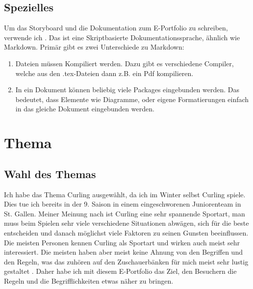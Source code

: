\documentclass[11pt]{article}
\begin{document}

    \subsection{Spezielles}
    Um das Storyboard und die Dokumentation zum E-Portfolio zu schreiben, verwende ich \latex. Das ist
    eine Skriptbasierte Dokumentationssprache, ähnlich wie Markdown. Primär gibt es zwei Unterschiede zu
    Markdown:
    \begin{enumerate}
        \item \latex Dateien müssen Kompiliert werden. Dazu gibt es verschiedene Compiler, welche aus den
        .tex-Dateien dann z.B. ein Pdf kompilieren.
        \item In ein \latex Dokument können beliebig viele Packages eingebunden werden. Das bedeutet, dass
        Elemente wie Diagramme, oder eigene Formatierungen einfach in das gleiche Dokument eingebunden werden.
    \end{enumerate}

    \pagebreak


    \section{Thema}



    \subsection{Wahl des Themas}

    Ich habe das Thema Curling ausgewählt, da ich im Winter selbst Curling spiele. Dies tue ich bereits in der
    9. Saison in einem eingeschworenen Juniorenteam in St. Gallen.
    Meiner Meinung nach ist Curling eine sehr spannende Sportart, man muss beim Spielen sehr viele verschiedene
    Situationen abwägen, sich für die beste entscheiden und danach möglichst viele Faktoren zu seinen Gunsten
    beeinflussen. \\
    Die meisten Personen kennen Curling als Sportart und wirken auch meist sehr interessiert. Die meisten haben
    aber meist keine Ahnung von den Begriffen und den Regeln, was das zuhören auf den Zuschauerbänken für mich
    meist sehr lustig gestaltet \smiley. Daher habe ich mit diesem E-Portfolio das Ziel, den Besuchern
    die Regeln und die Begrifflichkeiten etwas näher zu bringen.
\end{document}
